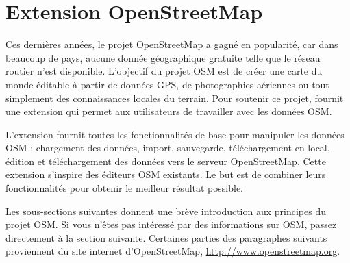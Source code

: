 
\section{Extension OpenStreetMap}


Ces dernières années, le projet OpenStreetMap a gagné en popularité, car dans beaucoup de pays, aucune donnée géographique gratuite telle que le réseau routier n'est disponible. L'objectif du projet OSM est de créer une carte du monde éditable à partir de données GPS, de photographies aériennes ou tout simplement des connaissances locales du terrain. Pour soutenir ce projet, \qg fournit une extension qui permet aux utilisateurs de travailler avec les données OSM.

L'extension fournit toutes les fonctionnalités de base pour manipuler les données OSM : chargement des données, import, sauvegarde, téléchargement en local, édition et téléchargement des données vers le serveur OpenStreetMap. Cette extension s'inspire des éditeurs OSM existants. Le but est de combiner leurs fonctionnalités pour obtenir le meilleur résultat possible.

Les sous-sections suivantes donnent une brève introduction aux principes du projet OSM. Si vous n'êtes pas intéressé par des informations sur OSM, passez directement à la section suivante. Certaines parties des paragraphes suivants proviennent du site internet d'OpenStreetMap, \url{http://www.openstreetmap.org}.

